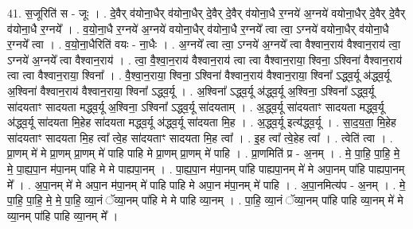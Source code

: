 \documentclass[17pt]{extarticle}
\begin{document}
41. स॒जूरिति॑ स - जूः । . दे॒वैर् व॑योना॒धैर् व॑योना॒धैर् दे॒वैर् दे॒वैर् व॑योना॒धै र॒ग्नये॑ अ॒ग्नये॑ वयोना॒धैर् दे॒वैर् दे॒वैर् व॑योना॒धै र॒ग्नये᳚ । . व॒यो॒ना॒धै र॒ग्नये॑ अ॒ग्नये॑ वयोना॒धैर् व॑योना॒धै र॒ग्नये᳚ त्वा त्वा॒ ऽग्नये॑ वयोना॒धैर् व॑योना॒धै र॒ग्नये᳚ त्वा । . व॒यो॒ना॒धैरिति॑ वयः - ना॒धैः । . अ॒ग्नये᳚ त्वा त्वा॒ ऽग्नये॑ अ॒ग्नये᳚ त्वा वैश्वान॒राय॑ वैश्वान॒राय॑ त्वा॒ ऽग्नये॑ अ॒ग्नये᳚ त्वा वैश्वान॒राय॑ । . त्वा॒ वै॒श्वा॒न॒राय॑ वैश्वान॒राय॑ त्वा त्वा वैश्वान॒राया॒ श्विना॒ ऽश्विना॑ वैश्वान॒राय॑ त्वा त्वा वैश्वान॒राया॒ श्विना᳚ । . वै॒श्वा॒न॒राया॒ श्विना॒ ऽश्विना॑ वैश्वान॒राय॑ वैश्वान॒राया॒ श्विना᳚ ऽद्ध्व॒र्यू अ॑द्ध्व॒र्यू अ॒श्विना॑ वैश्वान॒राय॑ वैश्वान॒राया॒ श्विना᳚ ऽद्ध्व॒र्यू । . अ॒श्विना᳚ ऽद्ध्व॒र्यू अ॑द्ध्व॒र्यू अ॒श्विना॒ ऽश्विना᳚ ऽद्ध्व॒र्यू सा॑दयताꣳ सादयता मद्ध्व॒र्यू अ॒श्विना॒ ऽश्विना᳚ ऽद्ध्व॒र्यू सा॑दयताम् । . अ॒द्ध्व॒र्यू सा॑दयताꣳ सादयता मद्ध्व॒र्यू अ॑द्ध्व॒र्यू सा॑दयता मि॒हेह सा॑दयता मद्ध्व॒र्यू अ॑द्ध्व॒र्यू सा॑दयता मि॒ह । . अ॒द्ध्व॒र्यू इत्य॑द्ध्व॒र्यू । . सा॒द॒य॒ता॒ मि॒हेह सा॑दयताꣳ सादयता मि॒ह त्वा᳚ त्वे॒ह सा॑दयताꣳ सादयता मि॒ह त्वा᳚ । . इ॒ह त्वा᳚ त्वे॒हेह त्वा᳚ । . त्वेति॑ त्वा । . प्रा॒णम् मे॑ मे प्रा॒णम् प्रा॒णम् मे॑ पाहि पाहि मे प्रा॒णम् प्रा॒णम् मे॑ पाहि । . प्रा॒णमिति॑ प्र - अ॒नम् । . मे॒ पा॒हि॒ पा॒हि॒ मे॒ मे॒ पा॒ह्य॒पा॒न म॑पा॒नम् पा॑हि मे मे पाह्यपा॒नम् । . पा॒ह्य॒पा॒न म॑पा॒नम् पा॑हि पाह्यपा॒नम् मे॑ मे अपा॒नम् पा॑हि पाह्यपा॒नम् मे᳚ । . अ॒पा॒नम् मे॑ मे अपा॒न म॑पा॒नम् मे॑ पाहि पाहि मे अपा॒न म॑पा॒नम् मे॑ पाहि । . अ॒पा॒नमित्य॑प - अ॒नम् । . मे॒ पा॒हि॒ पा॒हि॒ मे॒ मे॒ पा॒हि॒ व्या॒नं ॅव्या॒नम् पा॑हि मे मे पाहि व्या॒नम् । . पा॒हि॒ व्या॒नं ॅव्या॒नम् पा॑हि पाहि व्या॒नम् मे॑ मे व्या॒नम् पा॑हि पाहि व्या॒नम् मे᳚ । \newline
\end{document}
